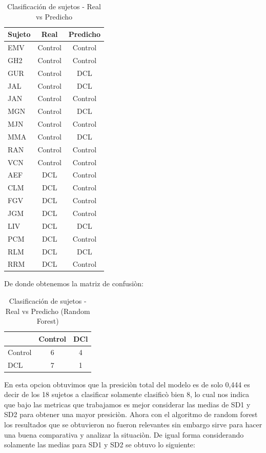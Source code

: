 \begin{table}[H]
\centering
\caption{Clasificación de sujetos - Real vs Predicho}
\label{tab:clasificacion2}
\begin{tabular}{lcc}
\toprule
\textbf{Sujeto} & \textbf{Real} & \textbf{Predicho} \\
\midrule
EMV  & Control & Control \\
GH2  & Control & Control \\
GUR  & Control & DCL \\
JAL  & Control & DCL \\
JAN  & Control & Control \\
MGN  & Control & DCL \\
MJN  & Control & Control \\
MMA  & Control & DCL \\
RAN  & Control & Control \\
VCN  & Control & Control \\
AEF  & DCL     & Control \\
CLM  & DCL     & Control \\
FGV  & DCL     & Control \\
JGM  & DCL     & Control \\
LIV  & DCL     & DCL \\
PCM  & DCL     & Control \\
RLM  & DCL     & DCL \\
RRM  & DCL     & Control \\
\bottomrule
\end{tabular}
\end{table}

De donde obtenemos la matriz de confusiòn:

\begin{table}[H]
\centering
\caption{Clasificación de sujetos - Real vs Predicho (Random Forest)}
\label{tab:clasificacion2_rf}
\begin{tabular}{lcc}
\toprule
\textbf{} & \textbf{Control} & \textbf{DCl} \\
\midrule
Control & 6 & 4 \\
DCL  & 7 & 1 \\
\bottomrule
\end{tabular}
\end{table}


En esta opcion obtuvimos que la presiciòn total del modelo es de solo 0,444 es decir de los 18
sujetos a clasificar solamente clasificò bien 8, lo cual nos indica que bajo las metricas que trabajamos
es mejor considerar las medias de SD1 y SD2 para obtener una mayor presiciòn.
Ahora con el algoritmo de random forest los resultados que se obtuvieron no fueron relevantes
sin embargo sirve para hacer una buena comparativa y analizar la situaciòn.
De igual forma considerando solamente las medias para SD1 y SD2 se obtuvo lo siguiente:

